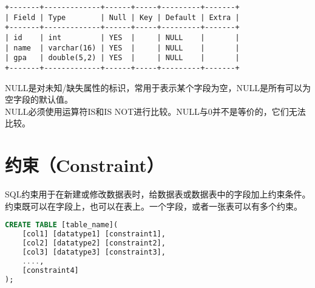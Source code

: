 \documentclass[12pt, openany, oneside]{book}
\begin{document}
\begin{tcolorbox}
	\begin{verbatim}
+-------+-------------+------+-----+---------+-------+
| Field | Type        | Null | Key | Default | Extra |
+-------+-------------+------+-----+---------+-------+
| id    | int         | YES  |     | NULL    |       |
| name  | varchar(16) | YES  |     | NULL    |       |
| gpa   | double(5,2) | YES  |     | NULL    |       |
+-------+-------------+------+-----+---------+-------+
	\end{verbatim}
\end{tcolorbox}

NULL是对未知/缺失属性的标识，常用于表示某个字段为空，NULL是所有可以为空字段的默认值。\\

NULL必须使用运算符IS和IS NOT进行比较。NULL与0并不是等价的，它们无法比较。\\

\section{约束（Constraint）}

SQL约束用于在新建或修改数据表时，给数据表或数据表中的字段加上约束条件。约束既可以在字段上，也可以在表上。一个字段，或者一张表可以有多个约束。

\vspace{-0.5cm}

\begin{lstlisting}[language=SQL]
CREATE TABLE [table_name](
    [col1] [datatype1] [constraint1],
    [col2] [datatype2] [constraint2],
    [col3] [datatype3] [constraint3],
    ....,
    [constraint4]
);
\end{lstlisting}

\begin{table}[H]
	\centering
	\caption{约束}
\end{table}
\end{document}
